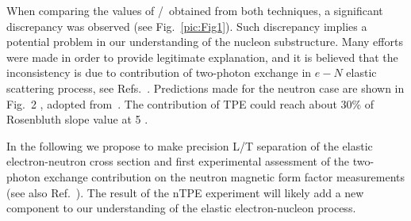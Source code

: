 When comparing the values of \gep/\gmp~obtained from both techniques, a significant discrepancy was observed (see Fig.~\ref{pic:Fig1}). 
Such discrepancy implies a potential problem in our understanding of the nucleon substructure. 
Many efforts were made in order to provide legitimate explanation, and it is believed that the inconsistency is due to contribution of two-photon exchange
in $e-N$ elastic scattering process, see Refs.~\cite{Arrington:2011dn, Afanasev:2017gsk}.
Predictions made for the neutron case are shown in Fig.~2
, adopted from~\cite{Blunden:2005ew}.
The contribution of TPE could reach about 30\% of Rosenbluth slope value at 5 \gevcsq.

In the following we propose to make precision L/T separation of the elastic electron-neutron cross section and first experimental assessment 
of the two-photon exchange contribution on the neutron magnetic form factor measurements (see also Ref.~\cite{Wojtsekhowski:2017kti}).
The result of the nTPE experiment will likely add a new component to our understanding of the elastic electron-nucleon process.
